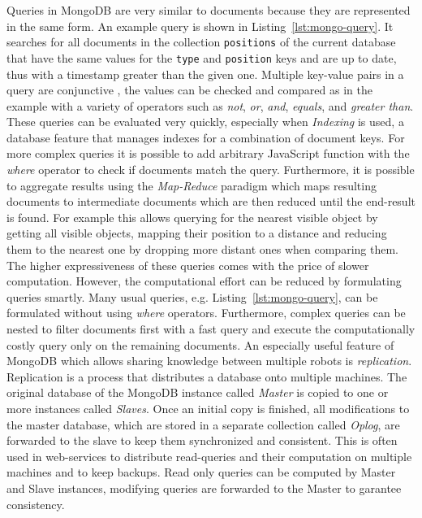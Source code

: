 \documentclass[a4paper,11pt]{article}
\newcommand{\reflst}[1]{Listing~\ref{#1}}
\begin{document}
Queries in MongoDB are very similar to documents because they are
represented in the same form.  An example query is
shown in \reflst{lst:mongo-query}. It searches for all documents in
the collection \texttt{positions} of the current database that have
the same values for the \texttt{type} and \texttt{position} keys and
are up to date, thus with a timestamp greater than the given
one. Multiple key-value pairs in a query are conjunctive , the values can be checked and compared as in the example
with a variety of operators such as \textit{not}, \textit{or},
\textit{and}, \textit{equals}, and \textit{greater than}. These
queries can be evaluated very quickly, especially when \emph{Indexing}
is used, a database feature that manages indexes for a combination of
document keys.
%
For more complex queries it is
possible to add arbitrary JavaScript function with the \textit{where}
operator to check if documents match the query. Furthermore, it is
possible to aggregate results using the \emph{Map-Reduce} paradigm
which maps resulting documents to intermediate documents which are
then reduced until the end-result is found. For example this allows
querying for the nearest visible object by getting all visible
objects, mapping their position to a distance and reducing them to the
nearest one by dropping more distant ones when comparing them.  The
higher expressiveness of these queries comes with the price of slower
computation. However, the computational effort can be reduced by
formulating queries smartly. Many usual queries,
e.g. \reflst{lst:mongo-query}, can be formulated without using
\textit{where} operators. Furthermore, complex queries can be nested
to filter documents first with a fast query and execute the
computationally costly query only on the remaining documents.
%
An especially useful feature of MongoDB which allows sharing knowledge
between multiple robots is \emph{replication}. Replication is a
process that distributes a database onto multiple machines. The
original database of the MongoDB instance called \emph{Master} is
copied to one or more instances called \emph{Slaves}. Once an initial
copy is finished, all modifications to the master database, which are
stored in a separate collection called \emph{Oplog}, are forwarded to
the slave to keep them synchronized and consistent. This is often used
in web-services to distribute read-queries and their computation on
multiple machines and to keep backups. Read only queries can be
computed by Master and Slave instances, modifying queries are
forwarded to the Master to garantee consistency.
\end{document}
